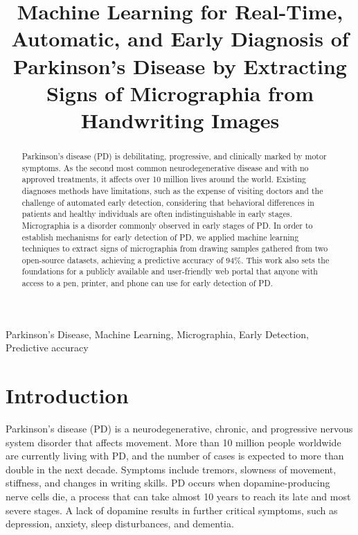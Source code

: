 \documentclass[pmlr,twocolumn,10pt]{jmlr} %
\title[Machine Learning for Diagnosis of Parkinson's Disease]{Machine Learning for Real-Time, Automatic, and Early Diagnosis of Parkinson’s Disease by Extracting Signs of Micrographia from Handwriting Images}
\begin{document}
\maketitle

\begin{abstract}
Parkinson’s disease (PD) is debilitating, progressive, and clinically marked by motor symptoms. As the second most common neurodegenerative disease and with no approved treatments, it affects over 10 million lives around the world. Existing diagnoses methods have limitations, such as the expense of visiting doctors and the challenge of automated early detection, considering that behavioral differences in patients and healthy individuals are often indistinguishable in early stages. Micrographia is a disorder commonly observed in early stages of PD. In order to establish mechanisms for early detection of PD, we applied machine learning techniques to extract signs of micrographia from drawing samples gathered from two open-source datasets, achieving a predictive accuracy of 94\%. This work also sets the foundations for a publicly available and user-friendly web portal that anyone with access to a pen, printer, and phone can use for early detection of PD.
\end{abstract}

\begin{keywords}
Parkinson’s Disease, Machine Learning, Micrographia, Early Detection, Predictive accuracy
\end{keywords}

\section{Introduction}
\label{sec:intro}

Parkinson’s disease (PD) is a neurodegenerative, chronic, and progressive nervous system disorder that affects movement. More than 10 million people worldwide are currently living with PD, and the number of cases is expected to more than double in the next decade. \citep{choi2017refining} Symptoms include tremors, slowness of movement, stiffness, and changes in writing skills. PD occurs when dopamine-producing nerve cells die, a process that can take almost 10 years to reach its late and most severe stages. A lack of dopamine results in further critical symptoms, such as depression, anxiety, sleep disturbances, and dementia. 
\end{document}
